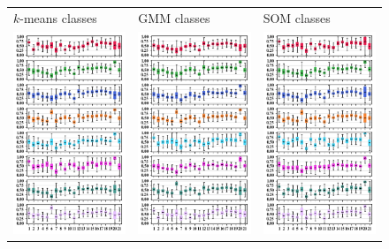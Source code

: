 \documentclass[utf8]{frontiersSCNS} %
\begin{document}
\begin{figure}[h!]\centering
	\begin{tabular}{CCC}
		$k$-means classes & GMM classes & SOM classes \\
		\includegraphics[width=5.5cm]{Amaya/classesdatarange-kmeans} &
		\includegraphics[width=5.5cm]{Amaya/classesdatarange-gmm} &
		\includegraphics[width=5.5cm]{Amaya/classesdatarange-som} \hfill \\

\end{tabular}
\end{figure}
\end{document}
